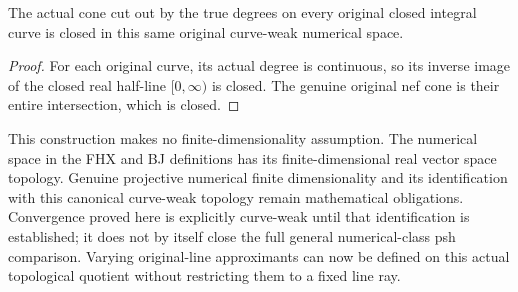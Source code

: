 \begin{theorem}
\label{thm:native-numerical-nef-curve-weak-closed}
\leanok
{}
The actual cone cut out by the true degrees on every original closed
integral curve is closed in this same original curve-weak numerical space.
\end{theorem}
\begin{proof}
For each original curve, its actual degree is continuous, so its inverse
image of the closed real half-line $[0,\infty)$ is closed. The genuine
original nef cone is their entire intersection, which is closed.
\end{proof}

\begin{remark}
This construction makes no finite-dimensionality assumption. The numerical
space in the FHX and BJ definitions has its finite-dimensional real vector
space topology. Genuine projective numerical finite dimensionality and its
identification with this canonical curve-weak topology remain mathematical
obligations. Convergence proved here is explicitly curve-weak until that
identification is established; it does not by itself close the full general
numerical-class psh comparison. Varying original-line approximants can now
be defined on this actual topological quotient without restricting them to
a fixed line ray.
\end{remark}
